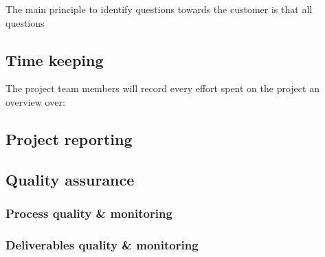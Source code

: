 The main principle to identify questions towards the customer is that all questions 

\subsection{Time keeping}
The project team members will record every effort spent on the project an overview over:


\subsection{Project reporting}
\lipsum[1]

\subsection{Quality assurance}
\lipsum[1]

\subsubsection{Process quality \& monitoring}
\lipsum[1]

\subsubsection{Deliverables quality \& monitoring}
\lipsum[1]
